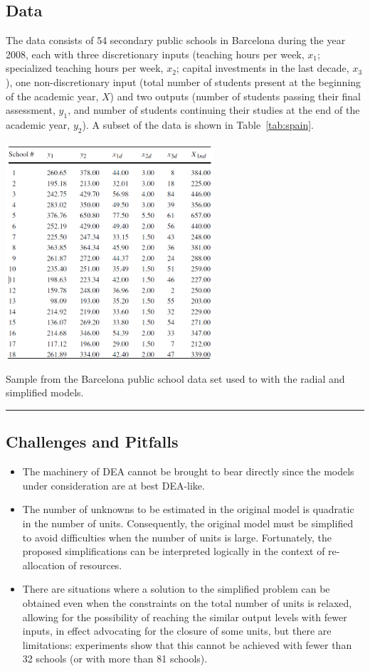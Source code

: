 \subsection*{Data}
The data consists of 54 secondary public schools in Barcelona during the year 2008, each with three discretionary inputs (teaching hours per week, $x_1$; specialized teaching hours per week, $x_2$; capital investments in the last decade, $x_3$), one non-discretionary input (total number of students present at the beginning of the academic year, $X$) and two outputs (number of students passing their final assessment, $y_1$, and number of students continuing their studies at the end of the academic year, $y_2$). A subset of the data is shown in Table~\ref{tab:spain}.
\begin{table}[t]
  \begin{center}
    \includegraphics[width=0.58\textwidth]{Images/publicschooldata}
  \end{center}
  \caption[\small Sample from the Barcelona public school data.]{\small Sample from the Barcelona public school data set used to with the radial and simplified models.}\hrule
  \label{tab:spain}
\end{table}
\subsection*{Challenges and Pitfalls}
\begin{itemize}[noitemsep]
\item The machinery of DEA cannot be brought to bear directly since the models under consideration are at best DEA-like.
\item The number of unknowns to be estimated in the original model is quadratic in the number of units. Consequently, the original model must be simplified to avoid difficulties when the number of units is large. Fortunately, the proposed simplifications can be interpreted logically in the context of re-allocation of resources.
\item There are situations where a solution to the simplified problem can be obtained even when the constraints on the total number of units is relaxed, allowing for the possibility of reaching the similar output levels with fewer inputs, in effect advocating for the closure of some units, but there are limitations: experiments show that this cannot be achieved with fewer than 32 schools (or with more than 81 schools).  
\end{itemize}
